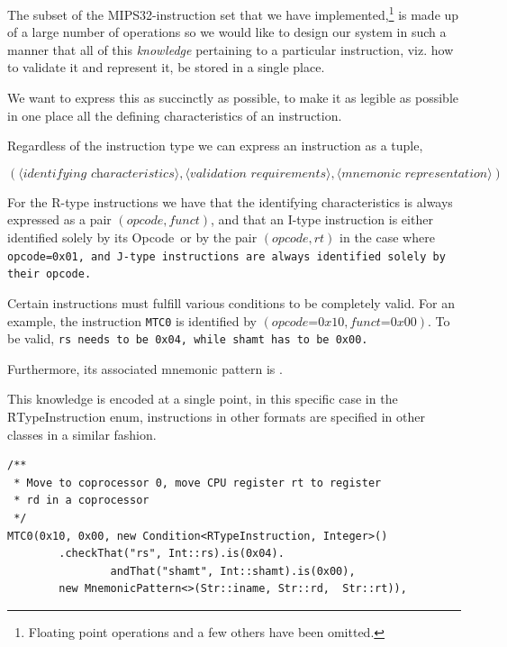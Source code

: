 \documentclass[a4paper]{article}
\newcommand{\opcode}{Opcode\ }
\begin{document}
The subset of the MIPS32-instruction set that we have
implemented,\footnote{Floating point operations and a few others have
  been omitted.} is made up of a large number of operations so we would
like to design our system in such a manner that all of this
\emph{knowledge} pertaining to a particular instruction, viz. how to
validate it and represent it, be stored in a single place.

We want to express this as succinctly as possible, to make it as
legible as possible in one place all the defining characteristics
of an instruction.

Regardless of the instruction type we can express an instruction
as a tuple,

\begin{equation*}
(\langle \textit{identifying characteristics} \rangle, \langle
  \textit{validation requirements} \rangle, \langle \textit{mnemonic
    representation} \rangle)
\end{equation*}

For the R-type instructions we have that the identifying
characteristics is always expressed as a pair $(\textit{opcode},
\textit{funct})$, and that an I-type instruction is either identified
solely by its \opcode or by the pair $(\textit{opcode}, \textit{rt})$
in the case where \tt{opcode=0x01}, and J-type instructions are always
identified solely by their opcode.

Certain instructions must fulfill various conditions to be completely
valid. For an example, the instruction \texttt{MTC0} is identified by
$(\textit{opcode=0x10}, \textit{funct=0x00})$. To be valid, \tt{rs}
needs to be \tt{0x04}, while \tt{shamt} has to be \tt{0x00}.

Furthermore, its associated mnemonic pattern is .

This knowledge is encoded at a single point, in this specific case
in the \h{RTypeInstruction} enum, instructions in other formats are
specified in other classes in a similar fashion.

\begin{verbatim}
/**
 * Move to coprocessor 0, move CPU register rt to register
 * rd in a coprocessor
 */
MTC0(0x10, 0x00, new Condition<RTypeInstruction, Integer>()
        .checkThat("rs", Int::rs).is(0x04).
                andThat("shamt", Int::shamt).is(0x00),
        new MnemonicPattern<>(Str::iname, Str::rd,  Str::rt)),
\end{verbatim}
\end{document}
